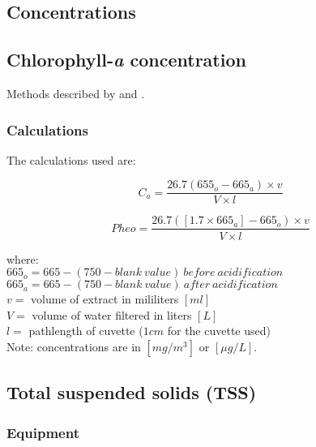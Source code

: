 \begin{appendices}
\section{Concentrations}
\subsection{Chlorophyll-{\it a} concentration}

Methods described by \cite{Lorenzen:1967fk} and \cite{Ritchie:2008eu}.

\subsubsection{Calculations}

The calculations used \cite{Lorenzen:1967fk} are:

\begin{equation}
  C_a = \frac{26.7(655_o - 665_a)\times v}{V\times l}
\end{equation}

\begin{equation}
  Pheo = \frac{26.7([1.7\times 665_a]-665_o)\times v}{V\times l}
\end{equation}

\noindent where: \\
$665_o = 665 - (750-blank~value)~before~acidification$\\
$665_a = 665 - (750-blank~value)~after~acidification$  \\
$v = $ volume of extract in mililiters $[ml]$ \\
$V = $ volume of water filtered in liters $[L]$ \\
$l = $ pathlength of cuvette ($1cm$ for the cuvette used) \\

Note: concentrations are in $[mg/m^3]$ or $[\mu g/L]$.


\subsection{Total suspended solids (TSS)}

\subsubsection{Equipment}
\begin{itemize}


\end{itemize}
\end{appendices}
